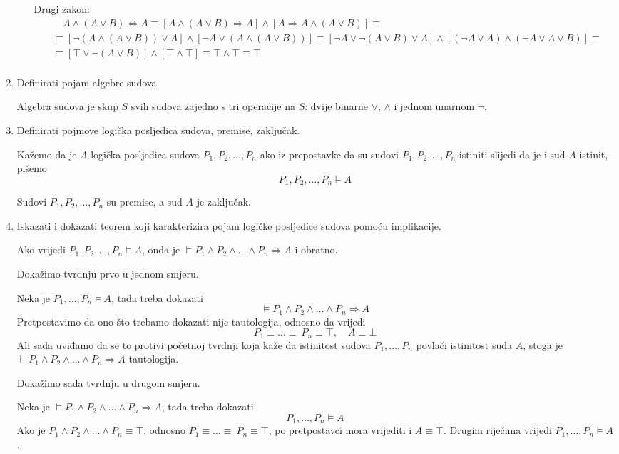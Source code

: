 \documentclass{article}
\begin{document}
\begin{enumerate}
\begin{itemize}
Drugi zakon:
\begin{align*}
&\quad A\land(A\lor B)\Leftrightarrow A\equiv[A\land(A\lor B)\Rightarrow A]\land[A\Rightarrow A\land(A\lor B)]\equiv\\
&\equiv[\neg(A\land(A\lor B))\lor A]\land[\neg A\lor (A\land (A\lor B))]\equiv[\neg A\lor\neg(A\lor B)\lor A]\land[(\neg A\lor A)\land(\neg A\lor A\lor B)]\equiv\\
&\equiv[\top\lor\neg(A\lor B)]\land[\top\land\top]\equiv\top\land\top\equiv\top\\
\end{align*}

\end{itemize}

\item Definirati pojam algebre sudova.

Algebra sudova je skup $S$ svih sudova zajedno s tri operacije na $S$: dvije binarne $\lor$, $\land$ i jednom unarnom $\neg$.

\item Definirati pojmove logička posljedica sudova, premise, zaključak.

Kažemo da je $A$ logička posljedica sudova $P_1, P_2, \ldots, P_n$ ako iz prepostavke da su sudovi $P_1, P_2, \ldots, P_n$ istiniti slijedi da je i sud $A$ istinit, pišemo
$$P_1, P_2, \ldots, P_n\vDash A$$

Sudovi $P_1, P_2, \ldots, P_n$ su premise, a sud $A$ je zaključak.

\item Iskazati i dokazati teorem koji karakterizira pojam logičke posljedice sudova pomoću implikacije.

Ako vrijedi $P_1, P_2, \ldots, P_n\vDash A$, onda je $\vDash P_1\land P_2\land\ldots\land P_n\Rightarrow A$ i obratno.

Dokažimo tvrdnju prvo u jednom smjeru.

Neka je $P_1, \ldots, P_n\vDash A$, tada treba dokazati $$\vDash P_1\land P_2\land\ldots\land P_n\Rightarrow A$$ 
Pretpostavimo da ono što trebamo dokazati nije tautologija, odnosno da vrijedi
$$P_1\equiv\ldots\equiv\ P_n\equiv\top,\quad A\equiv\bot$$
Ali sada uviđamo da se to protivi početnoj tvrdnji koja kaže da istinitost sudova $P_1, \ldots, P_n$ povlači istinitost suda $A$, stoga je $\vDash P_1\land P_2\land\ldots\land P_n\Rightarrow A$ tautologija.

Dokažimo sada tvrdnju u drugom smjeru.

Neka je $\vDash P_1\land P_2\land\ldots\land P_n\Rightarrow A$, tada treba dokazati $$P_1, \ldots, P_n\vDash A$$
Ako je $P_1\land P_2\land\ldots\land P_n\equiv\top$, odnosno $P_1\equiv\ldots\equiv\ P_n\equiv\top$, po pretpostavci mora vrijediti i $A\equiv\top$. Drugim riječima vrijedi $P_1, \ldots, P_n\vDash A$.


\end{enumerate}
\end{document}
